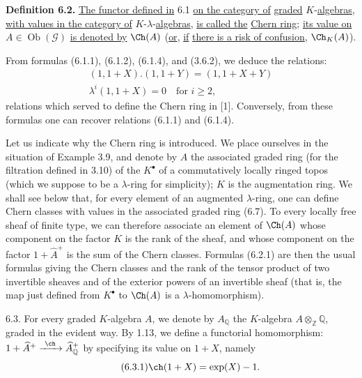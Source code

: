 %
\textbf{Definition 6.2.} \uline{The functor defined in} 6.1 \uline{on the category of} \uline{graded} \(K\)-\uline{algebras}, \uline{with values in the category of} \(K\)-\(\lambda\)-\uline{algebras}, \uline{is called the} \uline{Chern ring}; \uline{its value on} \(A\in\operatorname{Ob}(\mathcal G)\) \uline{is denoted by} \(\Ch(A)\) (\uline{or}, \uline{if} \uline{there is a risk of confusion}, \(\Ch_K(A)\)).

From formulas (6.1.1), (6.1.2), (6.1.4), and (3.6.2), we deduce the relations:
\begin{equation}\tag{6.2.1}
\begin{gathered}
 (1,1+X).(1,1+Y)=(1,1+X+Y)\\
 \lambda^i(1,1+X)=0\quad\text{for }i\ge2,
\end{gathered}
\end{equation}
relations which served to define the Chern ring in [1]. Conversely, from these formulas one can recover relations (6.1.1) and (6.1.4).

Let us indicate why the Chern ring is introduced. We place ourselves in the situation of Example 3.9, and denote by \(A\) the associated graded ring (for the filtration defined in 3.10) of the \(K^\bullet\) of a commutatively locally ringed topos (which we suppose to be a \(\lambda\)-ring for simplicity); \(K\) is the augmentation ring. We shall see below that, for every element of an augmented \(\lambda\)-ring, one can define Chern classes with values in the associated graded ring (6.7). To every locally free sheaf of finite type, we can therefore associate an element of \(\Ch(A)\) whose component on the factor \(K\) is the rank of the sheaf, and whose component on the factor \(1+\widehat A^+\) is the sum of the Chern classes. Formulas (6.2.1) are then the usual formulas giving the Chern classes and the rank of the tensor product of two invertible sheaves and of the exterior powers of an invertible sheaf (that is, the map just defined from \(K^\bullet\) to \(\Ch(A)\) is a \(\lambda\)-homomorphism).

%
6.3.
For every graded \(K\)-algebra \(A\), we denote by \(A_{\mathbb Q}\) the \(K\)-algebra \(A\otimes_{\mathbb Z}\mathbb Q\), graded in the evident way. By 1.13, we define a functorial homomorphism: \(1+\widehat A^+\xrightarrow{\ \ch\ }\widehat A_{\mathbb Q}^{+}\) by specifying its value on \(1+X\), namely
\begin{equation}\tag{6.3.1}
  \ch(1+X)=\exp(X)-1.
\end{equation}


